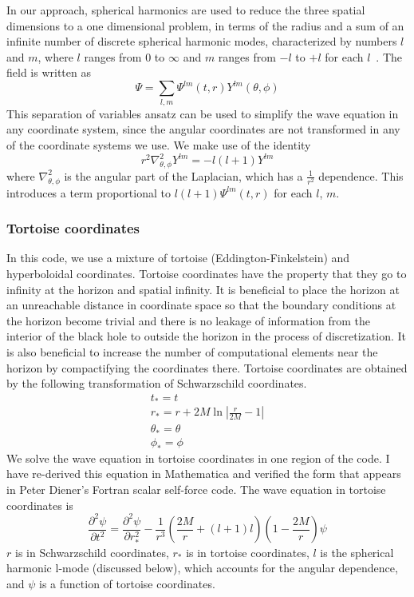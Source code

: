 In our approach, spherical harmonics are used to reduce the three spatial dimensions to a one dimensional problem, in terms of the radius and a sum of an infinite number of discrete spherical harmonic modes, characterized by numbers $l$ and $m$, where $l$ ranges from $0$ to $\infty$ and  $m$ ranges from $-l$ to $+l$ for each $l$~\cite{poisson_pound_vega_living_review}. The field is written as
\begin{equation}
  \Psi=\sum_{l,m}\Psi^{lm}(t,r)Y^{lm}(\theta,\phi)
\end{equation}
This separation of variables ansatz can be used to simplify the wave equation in any coordinate system, since the angular coordinates are not transformed in any of the coordinate systems we use. We make use of the identity
\begin{equation}
  r^2\nabla_{\theta,\phi}^2Y^{lm}=-l(l+1)Y^{lm}
\end{equation}
where $\nabla_{\theta,\phi}^2$ is the angular part of the Laplacian, which has a $\frac{1}{r^2}$ dependence. This introduces a term proportional to $l(l+1)\Psi^{lm}(t,r)$ for each $l$, $m$. 

\subsubsection{Tortoise coordinates}
In this code, we use a mixture of tortoise (Eddington-Finkelstein) and hyperboloidal coordinates. Tortoise coordinates have the property that they go to infinity at the horizon and spatial infinity. It is beneficial to place the horizon at an unreachable distance in coordinate space so that the boundary conditions at the horizon become trivial and there is no leakage of information from the interior of the black hole to outside the horizon in the process of discretization. It is also beneficial to increase the number of computational elements near the horizon by compactifying the coordinates there. Tortoise coordinates are obtained by the following transformation of Schwarzschild coordinates.~\cite{Wald}
\begin{eqnarray}
  t_*=t\\
  r_*=r+2M\ln|\frac{r}{2M}-1|\\
  \theta_*=\theta\\
  \phi_*=\phi
\end{eqnarray}
We solve the wave equation in tortoise coordinates in one region of the code. I have re-derived this equation in Mathematica and verified the form that appears in Peter Diener's Fortran scalar self-force code. The wave equation in tortoise coordinates is
\begin{equation}
  \frac{\partial^2\psi}{\partial t^2}=\frac{\partial^2\psi}{\partial r_*^2}-\frac{1}{r^3}\left(\frac{2M}{r}+(l+1)l\right)\left(1-\frac{2M}{r}\right)\psi
\end{equation}
$r$ is in Schwarzschild coordinates, $r_*$ is in tortoise coordinates, $l$ is the spherical harmonic l-mode (discussed below), which accounts for the angular dependence, and $\psi$ is a function of tortoise coordinates.


